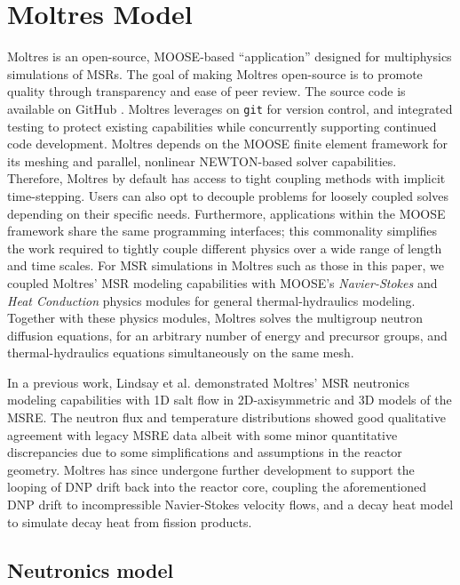 \section{Moltres Model}

Moltres \cite{lindsay_introduction_2018} is an open-source, \gls{MOOSE}-based
``application'' designed for multiphysics simulations of \glspl{MSR}. The goal
of making Moltres open-source is to promote quality through transparency and
ease of peer review. The source code \cite{lindsay_moltres_2017} is available
on GitHub \cite{github_build_2017}. Moltres leverages on \texttt{git} for
version control, and integrated testing to protect existing capabilities while
concurrently supporting continued code development. Moltres depends on the
\gls{MOOSE} finite element framework for its meshing and parallel, nonlinear
NEWTON-based solver capabilities. Therefore,
Moltres by default has access to tight coupling methods with implicit
time-stepping. Users can also opt to decouple problems for loosely coupled
solves depending on their specific needs. Furthermore, applications within the
\gls{MOOSE} framework share the same programming
interfaces; this commonality simplifies the work required to tightly couple
different physics over a wide range of length and time scales. For \gls{MSR}
simulations in Moltres such as those in this paper, we coupled Moltres'
\gls{MSR} modeling capabilities with \gls{MOOSE}'s \textit{Navier-Stokes} and
\textit{Heat Conduction} physics modules \cite{peterson_overview_2017} for
general thermal-hydraulics modeling. Together with these physics modules,
Moltres solves the multigroup neutron diffusion equations, for an arbitrary
number of energy and precursor groups, and thermal-hydraulics equations
simultaneously on the same mesh.

In a previous work, Lindsay et al. \cite{lindsay_introduction_2018}
demonstrated Moltres' \gls{MSR} neutronics modeling capabilities with 1D salt
flow in 2D-axisymmetric and 3D models of the \gls{MSRE}. The neutron flux and
temperature distributions showed good qualitative agreement with legacy
\gls{MSRE} data albeit with some minor quantitative discrepancies due to some
simplifications and assumptions in the reactor geometry. Moltres has
since undergone further development to support the looping of \gls{DNP} drift
back into the reactor core, coupling the aforementioned \gls{DNP} drift
to incompressible Navier-Stokes velocity flows, and a decay heat model to
simulate decay heat from fission products.

\subsection{Neutronics model}

